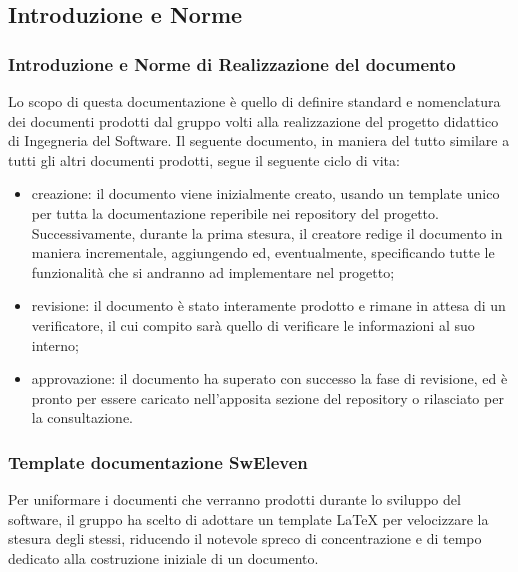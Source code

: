 \subsection{Introduzione e Norme}
\subsubsection{Introduzione e Norme di Realizzazione del documento}
Lo scopo di questa documentazione è quello di definire standard e nomenclatura dei documenti prodotti dal gruppo {\Gruppo}  volti alla realizzazione del progetto didattico di Ingegneria del Software.
Il seguente documento, in maniera del tutto similare a tutti gli altri documenti prodotti, segue il seguente ciclo di vita:
\begin{itemize}
\item creazione: il documento viene inizialmente creato, usando un template unico per tutta la documentazione reperibile nei repository del progetto. Successivamente, durante la prima stesura, il creatore redige il documento in maniera incrementale, aggiungendo ed, eventualmente, specificando tutte le funzionalità che si andranno ad implementare nel progetto;
\item revisione: il documento è stato interamente prodotto e rimane in attesa di un verificatore, il cui compito sarà quello di verificare le informazioni al suo interno;
\item approvazione: il documento ha superato con successo la fase di revisione, ed è pronto per essere caricato nell’apposita sezione del repository o rilasciato per la consultazione.
\end{itemize}
\subsubsection{Template documentazione SwEleven}
Per uniformare i documenti che verranno prodotti durante lo sviluppo del software, il gruppo ha scelto di adottare un template \LaTeX{} per velocizzare la stesura degli stessi, riducendo il notevole spreco di concentrazione e di tempo dedicato alla costruzione iniziale di un documento.